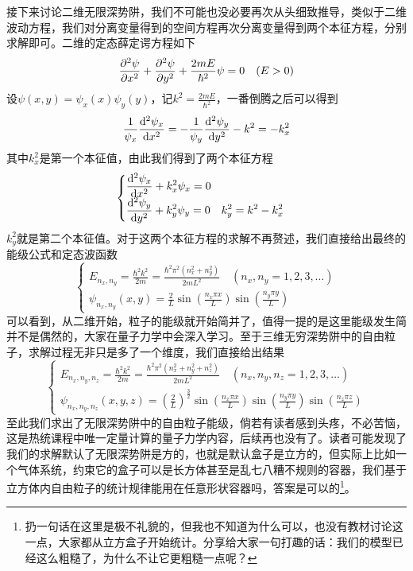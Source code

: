 \documentclass[../../main.tex]{subfiles}
\begin{document}
\begin{example}
\begin{solution}
    接下来讨论二维无限深势阱，我们不可能也没必要再次从头细致推导，类似于二维波动方程，我们对分离变量得到的空间方程再次分离变量得到两个本征方程，分别求解即可。二维的定态薛定谔方程如下
    \begin{equation*}
        \pdv[2]{\psi}{x}+\pdv[2]{\psi}{y}+\frac{2mE}{\hbar^2}\psi=0\quad (E>0)
    \end{equation*}
    设\(\psi(x,y)=\psi_x(x)\psi_y(y)\)，记\(k^2=\frac{2mE}{\hbar^2}\)，一番倒腾之后可以得到
    \begin{equation*}
        \frac{1}{\psi_x}\dv[2]{\psi_x}{x}=-\frac{1}{\psi_y}\dv[2]{\psi_y}{y}-k^2=-k_x^2
    \end{equation*}
    其中\(k_x^2\)是第一个本征值，由此我们得到了两个本征方程
    \begin{equation*}
        \begin{cases}
            \displaystyle \dv[2]{\psi_x}{x}+k_x^2\psi_x=0 \\
            \displaystyle \dv[2]{\psi_y}{y}+k_y^2\psi_y=0\quad k_y^2=k^2-k_x^2
        \end{cases}
    \end{equation*}
    \(k_y^2\)就是第二个本征值。对于这两个本征方程的求解不再赘述，我们直接给出最终的能级公式和定态波函数
    \begin{equation*}
        \begin{cases}
            \displaystyle E_{n_x,n_y}=\frac{\hbar^2k^2}{2m}=\frac{\hbar^2\pi^2(n_x^2+n_y^2)}{2mL^2} \quad (n_x,n_y=1,2,3,\dots) \\
            \displaystyle \psi_{n_x,n_y}(x,y)=\frac{2}{L}\sin\left(\frac{n_x\pi x}{L}\right)\sin\left(\frac{n_y\pi y}{L}\right)
        \end{cases}
    \end{equation*}
    可以看到，从二维开始，粒子的能级就开始简并了，值得一提的是这里能级发生简并不是偶然的，大家在量子力学中会深入学习。至于三维无穷深势阱中的自由粒子，求解过程无非只是多了一个维度，我们直接给出结果
    \begin{equation*}
        \begin{cases}
            \displaystyle E_{n_x,n_y,n_z}=\frac{\hbar^2k^2}{2m}=\frac{\hbar^2\pi^2(n_x^2+n_y^2+n_z^2)}{2mL^2} \quad (n_x,n_y,n_z=1,2,3,\dots) \\
            \displaystyle \psi_{n_x,n_y,n_z}(x,y,z)=\left(\frac{2}{L}\right)^{\frac{3}{2}}\sin\left(\frac{n_x\pi x}{L}\right)\sin\left(\frac{n_y\pi y}{L}\right)\sin\left(\frac{n_z\pi z}{L}\right)
        \end{cases}
    \end{equation*}
    至此我们求出了无限深势阱中的自由粒子能级，倘若有读者感到头疼，不必苦恼，这是热统课程中唯一定量计算的量子力学内容，后续再也没有了。读者可能发现了我们的求解默认了无限深势阱是方的，也就是默认盒子是立方的，但实际上比如一个气体系统，约束它的盒子可以是长方体甚至是乱七八糟不规则的容器，我们基于立方体内自由粒子的统计规律能用在任意形状容器吗，答案是可以的\footnote{扔一句话在这里是极不礼貌的，但我也不知道为什么可以，也没有教材讨论这一点，大家都从立方盒子开始统计。分享给大家一句打趣的话：我们的模型已经这么粗糙了，为什么不让它更粗糙一点呢？}。
    \end{solution}
\end{example}
\end{document}
